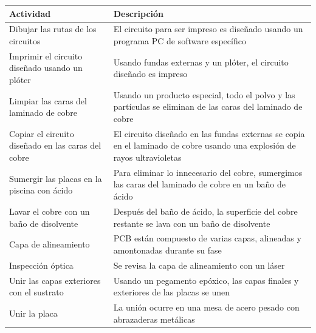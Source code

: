 \documentclass{article}
\begin{document}
\begin{table}[t]
	\begin{center}
		\begin{tabular}{ | p{4cm} | p{9cm} | }
			\hline Actividad                                   & Descripción                                                                                                              \\ \hline
			Dibujar las rutas de los circuitos                 & El circuito para ser impreso es diseñado usando un programa PC de software específico                                    \\ \hline
			Imprimir el circuito diseñado usando un plóter     & Usando fundas externas y un plóter, el circuito diseñado es impreso                                                      \\ \hline
			Limpiar las caras del laminado de cobre            & Usando un producto especial, todo el polvo y las partículas se eliminan de las caras del laminado de cobre               \\ \hline
			Copiar el circuito diseñado en las caras del cobre & El circuito diseñado en las fundas externas se copia en el laminado de cobre usando una explosión de rayos ultravioletas \\ \hline
			Sumergir las placas en la piscina con ácido        & Para eliminar lo innecesario del cobre, sumergimos las caras del laminado de cobre en un baño de ácido                   \\ \hline
			Lavar el cobre con un baño de disolvente           & Después del baño de ácido, la superficie del cobre restante se lava con un baño de disolvente                            \\ \hline
			Capa de alineamiento                               & PCB están compuesto de varias capas, alineadas y amontonadas durante su fase                                             \\ \hline
			Inspección óptica                                  & Se revisa la capa de alineamiento con un láser                                                                           \\ \hline
			Unir las capas exteriores con el sustrato          & Usando un pegamento epóxico, las capas finales y exteriores de las placas se unen                                        \\ \hline
			Unir la placa                                      & La unión ocurre en una mesa de acero pesado con abrazaderas metálicas                                                    \\ \hline

\end{tabular}
\end{center}
\end{table}
\end{document}
